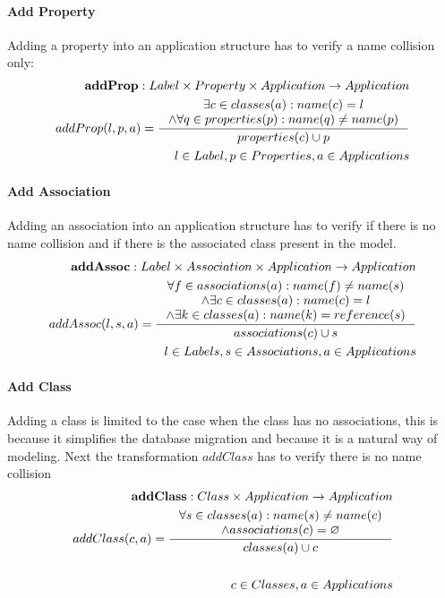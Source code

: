 \documentclass[11pt]{article}
\begin{document}
\paragraph{Add Property}Adding a property into an application structure has to verify a name collision only:
\begin{align*}
 	\mathbf{addProp} : Label \times Property \times Application \rightarrow Application \\
	addProp(l, p, a) = \inference{\exists c \in classes(a) : name(c) = l \\ \wedge \forall q \in  properties(p) : name(q) \neq name(p)}{properties(c) \cup p } \\
	l \in Label, p \in Properties, a \in Applications
\end{align*}
\paragraph{Add Association} Adding an association into an application structure has to verify if there is no name collision and if there is the associated class present in the model.
\begin{align*}
	\mathbf{addAssoc} : Label \times Association \times Application \rightarrow Application \\
	addAssoc(l, s, a) = \inference{\forall f \in associations(a) : name(f) \neq name(s) \\ \wedge \exists c \in classes(a) : name(c) = l \\ \wedge \exists k \in classes(a) : name(k) = reference(s) }{associations(c) \cup s}\\
	l \in Labels, s \in Associations, a \in Applications
\end{align*}
\paragraph{Add Class} Adding a class is limited to the case when the class has no associations, this is because it simplifies the database migration and because it is a natural way of modeling. Next the transformation $addClass$ has to verify there is no name collision
\begin{align*}
	\mathbf{addClass} : Class \times Application \rightarrow Application \\ 
	addClass(c, a) = \inference{\forall s \in classes(a) : name(s) \neq name(c) \\ \wedge associations(c) = \varnothing }{classes(a) \cup c} \\ \\
	c \in Classes, a \in Applications
\end{align*}
\end{document}
